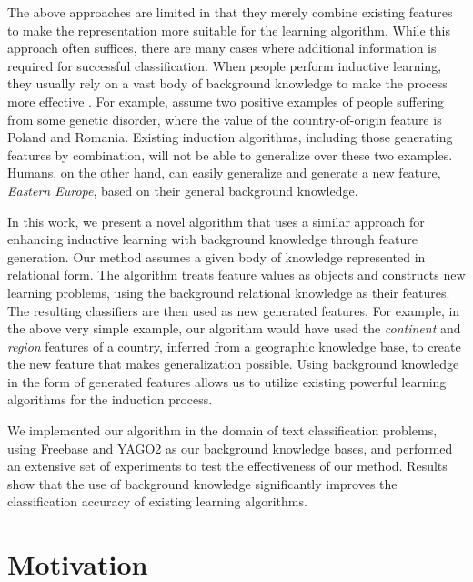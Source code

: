 \documentclass[twoside,11pt]{article}
\theoremstyle{definition}
\begin{document}
The above approaches are limited in that they merely combine existing features to make the representation more suitable for the 
learning algorithm.   While this approach often suffices, there are many cases where additional information is required for successful classification.
When people perform inductive learning, they usually rely on a vast body of background knowledge to make the process more
effective \cite{mcnamara1996learning}. For example, assume two positive examples of people suffering from some genetic disorder, where the 
value of the country-of-origin feature is Poland and Romania.  Existing induction algorithms, including those generating features 
by combination, will not be able to generalize over these two examples.  Humans, on the other hand, can easily generalize 
and generate a new feature, \emph{Eastern Europe}, based
on their general background knowledge.

In this work, we present a novel algorithm that uses a similar approach for enhancing inductive learning with background knowledge through feature generation.
Our method assumes a given body of knowledge represented in relational form.  The algorithm treats feature values as objects and constructs new learning problems, using the background relational knowledge as their features.  The resulting classifiers are then used as new generated features.
For example, in the above very simple example, our algorithm would have used the \emph{continent} and \emph{region} features of a country,
inferred from a geographic knowledge base, to create the new feature that makes generalization possible.  Using background knowledge in the form of generated features allows us to utilize existing powerful learning algorithms for the induction process.

We implemented our algorithm in the domain of text classification problems, using Freebase and YAGO2 as our background knowledge bases, 
and performed an extensive set of experiments to test the effectiveness of our method.  Results show that the use of background knowledge significantly improves the classification accuracy of existing learning algorithms.

\section{Motivation} \label{motivation}
\end{document}
